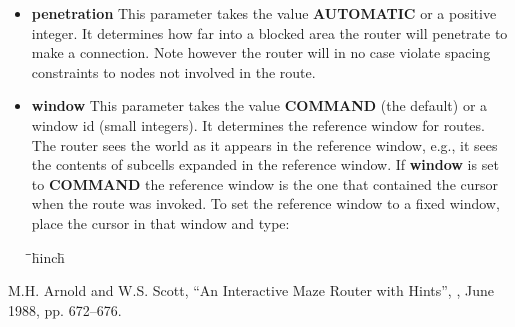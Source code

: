 \documentclass[letterpaper,twoside,12pt]{article}
\def\hinch{\hspace*{0.5in}}
\def\starti{\begin{center}\begin{tabbing}\hinch\=\hinch\=\hinch\=hinch\hinch\=\kill}
\def\endi{\end{tabbing}\end{center}}
\def\ii{\>\>\>}
\begin{document}
\begin{itemize}
\item {\bfseries penetration}
This parameter takes the value {\bfseries AUTOMATIC} or a positive integer.  It
determines how far into a blocked area the router will
penetrate to make a connection.  Note however the router will in no case
violate spacing constraints to nodes not involved in the route.

\item {\bfseries window}
This parameter takes the value {\bfseries COMMAND} (the default) or a window id 
(small integers).  It determines the reference window for routes.  The router
sees the world as it appears in the reference window, e.g., it sees the
contents of subcells expanded in the reference window.  If {\bfseries window}
is set to {\bfseries COMMAND} the reference window is the one that contained the
cursor when the route was invoked.  To set the reference window to a fixed
window, place the cursor in that window and type:
\starti
   \ii {\bfseries :iroute wizard window .}
\endi
\end{itemize}

\begin{thebibliography}{1}
    M.H. Arnold and W.S. Scott,
	\newblock ``An Interactive Maze Router with Hints'',
	,
	\newblock June 1988, pp. 672--676.
\end{thebibliography}
\end{document}

